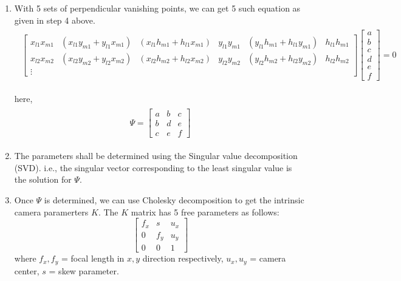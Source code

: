 \documentclass[fleqn]{article}
\begin{document}
\begin{enumerate}
  \item With 5 sets of perpendicular vanishing points, we can get 5 such equation as given in step 4 above.
  \begin{eqnarray*}
  \begin{aligned}
  \begin{bmatrix}
  x_{l1}x_{m1} &  (x_{l1}y_{m1} + y_{l1}x_{m1}) & (x_{l1}h_{m1} + h_{l1}x_{m1}) & y_{l1}y_{m1} & (y_{l1}h_{m1} + h_{l1}y_{m1}) & h_{l1}h_{m1}\\
  x_{l2}x_{m2} &  (x_{l2}y_{m2} + y_{l2}x_{m2}) & (x_{l2}h_{m2} + h_{l2}x_{m2}) & y_{l2}y_{m2} & (y_{l2}h_{m2} + h_{l2}y_{m2}) & h_{l2}h_{m2}\\
  \vdots
  \end{bmatrix}
  \begin{bmatrix}
  a \\ b \\ c\\ d\\ e\\ f
  \end{bmatrix} = 0
  \end{aligned}
  \end{eqnarray*}
 
  here, 
  \begin{eqnarray*}
  \begin{aligned}
  \Psi = \begin{bmatrix}
   		a & b & c \\
   		b & d & e \\
   		c & e & f
   \end{bmatrix}
  \end{aligned}
  \end{eqnarray*}
  \item The parameters shall be determined using the Singular value decomposition (SVD). i.e., the singular vector corresponding to the least singular
  value is the solution for $\Psi$.
  \item Once $\Psi$ is determined, we can use Cholesky decomposition to get the intrinsic camera paramerters $K$. 
  The $K$ matrix has 5 free parameters as follows:
  \[
   \begin{bmatrix}
   		f_x & s & u_x \\
   		0 & f_y & u_y \\
   		0 & 0 & 1
   \end{bmatrix}
  \]
  where  $f_x, f_y $ = focal length in $x, y$ direction respectively, $u_x, u_y$ = camera center, $s$ = skew parameter.


\end{enumerate}
\end{document}

